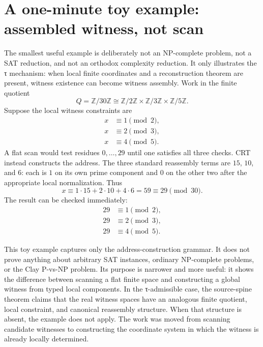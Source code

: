 \documentclass{pantarhei-researchnote}
\begin{document}
\section{A one-minute toy example: assembled witness, not scan}
\label{sec:toy-example}

The smallest useful example is deliberately not an NP-complete problem,
not a SAT reduction, and not an orthodox complexity reduction. It only
illustrates the τ mechanism: when local finite coordinates and a
reconstruction theorem are present, witness existence can become witness
assembly. Work in the finite quotient
\[
  Q=\mathbb{Z}/30\mathbb{Z}
  \cong
  \mathbb{Z}/2\mathbb{Z}\times
  \mathbb{Z}/3\mathbb{Z}\times
  \mathbb{Z}/5\mathbb{Z}.
\]
Suppose the local witness constraints are
\[
  \begin{aligned}
  x &\equiv 1 \pmod 2,\\
  x &\equiv 2 \pmod 3,\\
  x &\equiv 4 \pmod 5.
  \end{aligned}
\]
A flat scan would test residues \(0,\ldots,29\) until one satisfies all
three checks. CRT instead constructs the address. The three standard
reassembly terms are \(15\), \(10\), and \(6\): each is \(1\) on its own
prime component and \(0\) on the other two after the appropriate local
normalization. Thus
\[
  x \equiv 1\cdot 15 + 2\cdot 10 + 4\cdot 6
  =59 \equiv 29 \pmod {30}.
\]
The result can be checked immediately:
\[
  \begin{aligned}
  29&\equiv 1 \pmod 2,\\
  29&\equiv 2 \pmod 3,\\
  29&\equiv 4 \pmod 5.
  \end{aligned}
\]

This toy example captures only the address-construction grammar. It does
not prove anything about arbitrary SAT instances, ordinary NP-complete
problems, or the Clay P-vs-NP problem. Its purpose is narrower and more
useful: it shows the difference between scanning a flat finite space and
constructing a global witness from typed local components. In the
τ-admissible case, the source-spine theorem claims that the real witness
spaces have an analogous finite quotient, local constraint, and canonical
reassembly structure. When that structure is absent, the example does not
apply.
The work was moved from scanning candidate witnesses to constructing the
coordinate system in which the witness is already locally determined.
\end{document}
